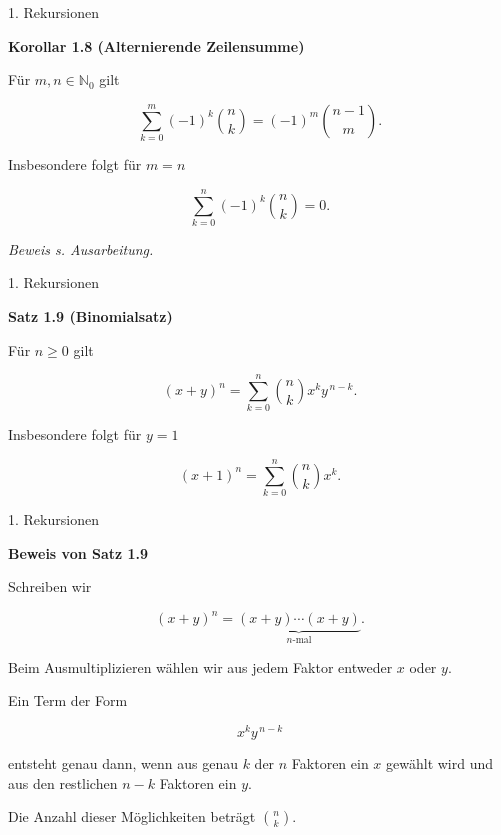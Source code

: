 \documentclass{beamer}
\begin{document}
\begin{frame}{1. Rekursionen}

\textbf{Korollar 1.8 (Alternierende Zeilensumme)}

\vspace{0.3cm}

Für \(m,n\in\mathbb N_0\) gilt

\[
\sum_{k=0}^{m}
(-1)^k
\binom{n}{k}
=
(-1)^m
\binom{n-1}{m}.
\]

\vspace{0.5cm}

Insbesondere folgt für \(m=n\)

\[
\sum_{k=0}^{n}
(-1)^k
\binom{n}{k}
=
0.
\]

\vspace{0.5cm}

\textit{Beweis s. Ausarbeitung.}

\end{frame}

\begin{frame}{1. Rekursionen}

\textbf{Satz 1.9 (Binomialsatz)}

\vspace{0.3cm}

Für \(n\geq 0\) gilt

\[
(x+y)^n
=
\sum_{k=0}^{n}
\binom{n}{k}
x^k y^{\,n-k}.
\]

\vspace{0.5cm}

Insbesondere folgt für \(y=1\)

\[
(x+1)^n
=
\sum_{k=0}^{n}
\binom{n}{k}
x^k.
\]

\end{frame}

\begin{frame}{1. Rekursionen}

\textbf{Beweis von Satz 1.9}

\vspace{0.3cm}

Schreiben wir

\[
(x+y)^n
=
\underbrace{(x+y)\cdots(x+y)}_{n\text{-mal}}.
\]

Beim Ausmultiplizieren wählen wir aus jedem Faktor
entweder \(x\) oder \(y\).

\vspace{0.3cm}

Ein Term der Form

\[
x^k y^{\,n-k}
\]

entsteht genau dann, wenn aus genau \(k\) der
\(n\) Faktoren ein \(x\) gewählt wird und aus den
restlichen \(n-k\) Faktoren ein \(y\).

\vspace{0.3cm}

Die Anzahl dieser Möglichkeiten beträgt \(\binom{n}{k}.\)

\end{frame}
\end{document}
